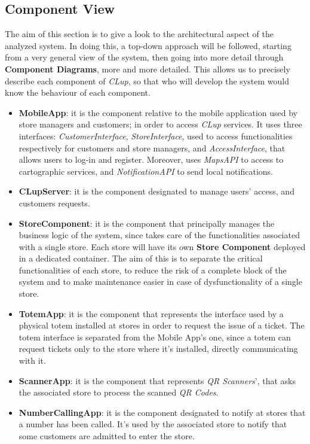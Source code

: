 \documentclass{article}
\begin{document}
	
	\subsection{Component View}
		The aim of this section is to give a look to the architectural aspect of the analyzed system. In doing this, a top-down approach will be followed, starting from a very general view of the system, then going into more detail through {\bfseries Component Diagrams}, more and more detailed. This allows us to precisely describe each component of \emph{CLup}, so that who will develop the system would know the behaviour of each component.\\
		
		\begin{itemize}
			\item {\bfseries MobileApp}: it is the component relative to the mobile application used by store managers and customers; in order to access \emph{CLup} services. It uses three interfaces: \emph{CustomerInterface}, \emph{StoreInterface}, used to access functionalities respectively for customers and store managers, and \emph{AccessInterface}, that allows users to log-in and register. Moreover, uses \emph{MapsAPI} to access to cartographic services, and \emph{NotificationAPI} to send local notifications.
			
			\item {\bfseries CLupServer}:  it is the component designated to manage users’ access, and customers requests.
			
			\item {\bfseries StoreComponent}: it is the component that principally manages the business logic of the system, since takes care of the functionalities associated with a single store. Each store will have its own {\bfseries Store Component} deployed in a dedicated container. The aim of this is to separate the critical functionalities of each store, to reduce the risk of a complete block of the system and to make maintenance easier in case of dysfunctionality of a single store.
			
			\item {\bfseries TotemApp}: it is the component that represents the interface used by a physical totem installed at stores in order to request the issue of a ticket. The totem interface is separated from the Mobile App’s one, since a totem can request tickets only to the store where it’s installed, directly communicating with it.
			
			\item {\bfseries ScannerApp}: it is the component that represents \emph{QR Scanners}’, that asks the associated store to process the scanned \emph{QR Codes}.
			
			\item {\bfseries NumberCallingApp}: it is the component designated to notify at stores that a number has been called. It’s used by the associated store to notify that some customers are admitted to enter the store.		
		\end{itemize}
	
\end{document}
